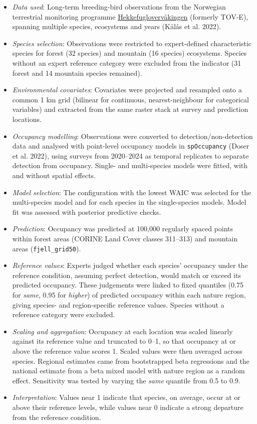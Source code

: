 \documentclass[
  letterpaper,
  DIV=11,
  numbers=noendperiod]{scrartcl}
\begin{document}
\begin{itemize}
\item
  \emph{Data used}: Long-term breeding-bird observations from the
  Norwegian terrestrial monitoring programme
  \href{https://hekkefuglovervakingen.nina.no/Fugl/Default.aspx?ReturnUrl=\%2fFugl\%2f}{Hekkefuglovervåkingen}
  (formerly TOV-E), spanning multiple species, ecosystems and years
  (Kålås et al. 2022).
\item
  \emph{Species selection}: Observations were restricted to
  expert-defined characteristic species for forest (32 species) and
  mountain (16 species) ecosystems. Species without an expert reference
  category were excluded from the indicator (31 forest and 14 mountain
  species remained).
\item
  \emph{Environmental covariates}: Covariates were projected and
  resampled onto a common 1 km grid (bilinear for continuous,
  nearest-neighbour for categorical variables) and extracted from the
  same raster stack at survey and prediction locations.
\item
  \emph{Occupancy modelling}: Observations were converted to
  detection/non-detection data and analysed with point-level occupancy
  models in \texttt{spOccupancy} (Doser et al. 2022), using surveys from
  2020--2024 as temporal replicates to separate detection from
  occupancy. Single- and multi-species models were fitted, with and
  without spatial effects.
\item
  \emph{Model selection}: The configuration with the lowest WAIC was
  selected for the multi-species model and for each species in the
  single-species models. Model fit was assessed with posterior
  predictive checks.
\item
  \emph{Prediction}: Occupancy was predicted at 100,000 regularly spaced
  points within forest areas (CORINE Land Cover classes 311--313) and
  mountain areas (\texttt{fjell\_grid50}).
\item
  \emph{Reference values}: Experts judged whether each species'
  occupancy under the reference condition, assuming perfect detection,
  would match or exceed its predicted occupancy. These judgements were
  linked to fixed quantiles (0.75 for \emph{same}, 0.95 for
  \emph{higher}) of predicted occupancy within each nature region,
  giving species- and region-specific reference values. Species without
  a reference category were excluded.
\item
  \emph{Scaling and aggregation}: Occupancy at each location was scaled
  linearly against its reference value and truncated to 0--1, so that
  occupancy at or above the reference value scores 1. Scaled values were
  then averaged across species. Regional estimates came from
  bootstrapped beta regressions and the national estimate from a beta
  mixed model with nature region as a random effect. Sensitivity was
  tested by varying the \emph{same} quantile from 0.5 to 0.9.
\item
  \emph{Interpretation}: Values near 1 indicate that species, on
  average, occur at or above their reference levels, while values near 0
  indicate a strong departure from the reference condition.
\end{itemize}
\end{document}
